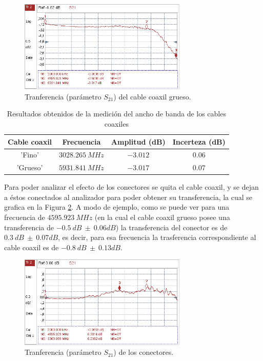 \documentclass[a4paper,10pt]{article}
\begin{document}
		\begin{figure}[!htb]
			\centering
			\includegraphics[width=8cm]
			{Imagenes/transferenciacablegroso.png}
			\caption{Tranferencia (par\'ametro $S_{21}$) del cable coaxil 
			grueso.}
			\label{coaxilgordo} 
		\end{figure}
		
	\begin{table}[!htp]
			\centering
			\begin{tabular}{|c|c|c|c|}
				\hline
			Cable coaxil	& Frecuencia & Amplitud (dB) & Incerteza (dB)\\
				\hline
			'Fino'	 &$3028.265~MHz$ & $-3.012$ & $0.06$ \\
			'Grueso' &$5931.841~MHz$ & $-3.017$ & $0.07$ \\				
			\end{tabular}
			\caption{Resultados obtenidos de la medici\'on del ancho de banda de los cables coaxiles} \label{puta}
		\end{table}	
		
		\indent Para poder analizar el efecto de los conectores se quita el 
		cable coaxil, y se dejan a \'estos conectados al analizador para poder 
		obtener su transferencia, la cual se grafica en la Figura 
		\ref{tranferenciaconectorrr}. A modo de ejemplo, como se puede ver para una frecuencia de $4595.923~MHz$ (en la cual el cable coaxil grueso posee una transferencia de $-0.5~dB~\pm~0.06dB$) la transferencia del conector es de $0.3~dB~\pm~0.07dB$, es decir, para esa frecuencia la trasferencia correspondiente al cable coaxil es de $-0.8~dB~\pm~0.13dB$. 
		

		\begin{figure}[!htb]
			\centering
			\includegraphics[width=8cm]
			{Imagenes/transferenciaconector.png}
			\caption{Tranferencia (par\'ametro $S_{21}$) de los conectores.}
			\label{tranferenciaconectorrr} 
		\end{figure}
		
\end{document}
